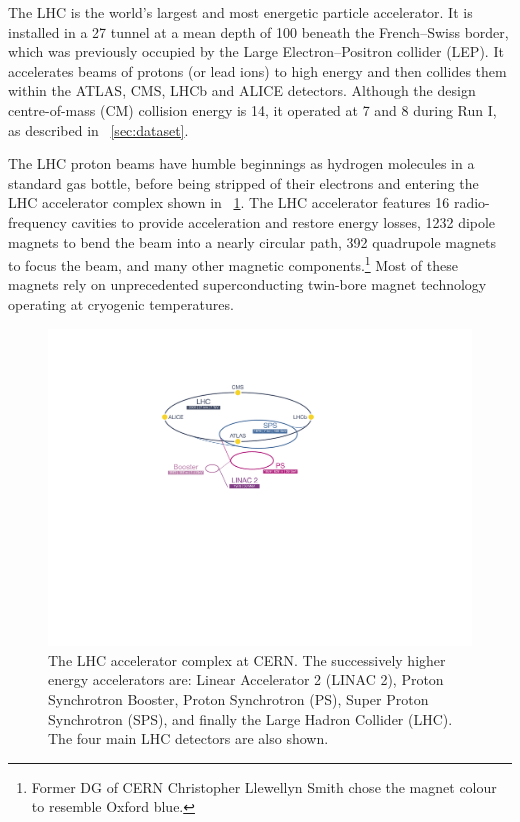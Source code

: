 
The LHC is the world's largest and most energetic particle accelerator. It is 
installed in a \unit{27}{\kilo\metre} tunnel at a mean depth of \unit{100}{\metre} beneath 
the French--Swiss border, which was previously occupied by the Large Electron--Positron 
collider (LEP). It accelerates beams of protons (or lead ions) to high energy and then 
collides them within the ATLAS, CMS, LHCb and ALICE detectors. Although the design 
centre-of-mass (CM) collision energy is \unit{14}{\TeV}, it operated at \unit{7}{\TeV} and 
\unit{8}{\TeV} during Run I, as described in \Section~\ref{sec:dataset}.

The LHC proton beams have humble beginnings as hydrogen molecules in a standard gas 
bottle, before being stripped of their electrons and entering the LHC accelerator 
complex shown in \Figure~\ref{fig:lhc}. The LHC accelerator features 16 
radio-frequency cavities to provide acceleration and restore energy losses, 1232 
dipole magnets to bend the beam into a nearly circular path, 392 quadrupole magnets to 
focus the beam, and many other magnetic components.\footnote{
	Former DG of CERN Christopher Llewellyn Smith chose the magnet colour to resemble Oxford blue.
}
Most of these magnets rely on unprecedented superconducting twin-bore magnet technology 
operating at cryogenic temperatures.

\begin{figure}[t]
	\includegraphics[width=\largefigwidth,clip=true,trim=9.7cm 13.4cm 13.4cm 4.7cm]{custom_images/accelerators}
	\caption{The LHC accelerator complex at CERN. The successively higher energy 
	accelerators are: Linear Accelerator 2 (LINAC 2), Proton Synchrotron Booster, Proton 
	Synchrotron (PS), Super Proton Synchrotron (SPS), and finally the Large Hadron 
	Collider (LHC). The four main LHC detectors are also shown.}
	\label{fig:lhc}
\end{figure}

